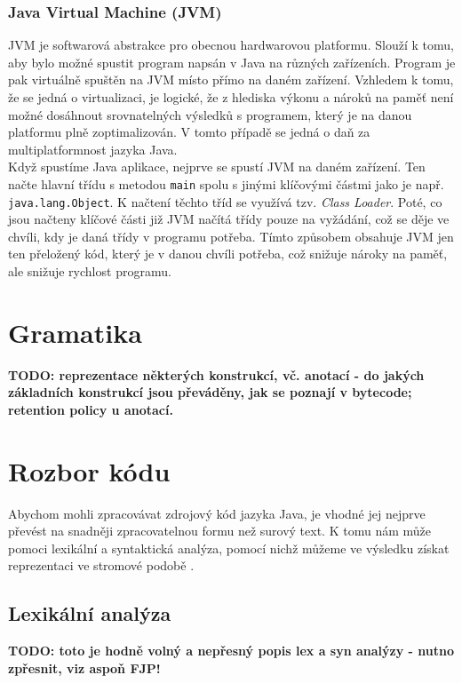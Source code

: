 			\subsubsection{Java Virtual Machine (JVM)}			
				JVM je softwarová abstrakce pro obecnou hardwarovou platformu. Slouží k tomu, aby bylo možné spustit program napsán v Java na různých zařízeních. Program je pak virtuálně spuštěn na JVM místo přímo na daném zařízení. Vzhledem k tomu, že se jedná o virtualizaci, je logické, že z hlediska výkonu a nároků na paměť není možné dosáhnout srovnatelných výsledků s programem, který je na danou platformu plně zoptimalizován. V tomto případě se jedná o daň za multiplatformnost jazyka Java.\\ 
			
			Když spustíme Java aplikace, nejprve se spustí JVM na daném zařízení. Ten načte hlavní třídu s metodou \texttt{main} spolu s jinými klíčovými částmi jako je např. \texttt{java.lang.Object}. K načtení těchto tříd se využívá tzv. \emph{Class Loader}. Poté, co jsou načteny klíčové části již JVM načítá třídy pouze na vyžádání, což se děje ve chvíli, kdy je daná třídy v programu potřeba. Tímto způsobem obsahuje JVM jen ten přeložený kód, který je v danou chvíli potřeba, což snižuje nároky na paměť, ale snižuje rychlost programu. 
	
	\section{Gramatika}
		\textbf{\textcolor{pblue}{TODO: reprezentace některých konstrukcí, vč. anotací - do jakých základních konstrukcí jsou převáděny, jak se poznají v bytecode; retention policy u anotací.	}}\\
	
	\section{Rozbor kódu}
		Abychom mohli zpracovávat zdrojový kód jazyka Java, je vhodné jej nejprve převést na snadněji zpracovatelnou formu než surový text. K tomu nám může pomoci lexikální a syntaktická analýza, pomocí nichž můžeme ve výsledku získat reprezentaci ve stromové podobě \cite{compilerTutorial}.
	
		\subsection{Lexikální analýza}
		
			\textbf{\textcolor{pblue}{TODO: toto je hodně volný a nepřesný popis lex a syn analýzy - nutno zpřesnit, viz aspoň FJP!}}\\					
		
